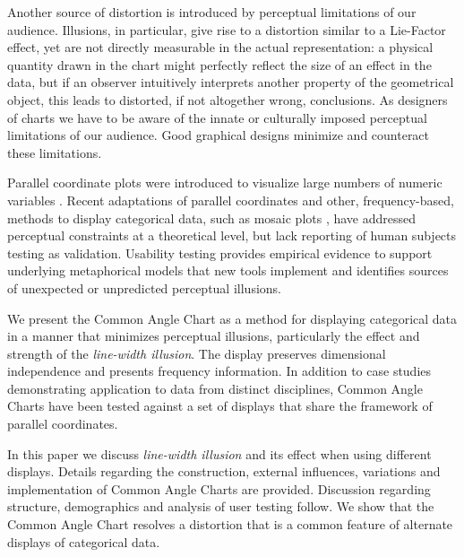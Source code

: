Another source of distortion is introduced by perceptual limitations of our audience. Illusions, in particular, give rise to a distortion similar to a Lie-Factor effect, yet are not directly measurable in the actual representation: a physical quantity drawn in the chart might  perfectly reflect the  size of an effect in the data, but if an observer  intuitively interprets another property of the geometrical object, this leads  to distorted, if not altogether wrong, conclusions. 
As designers of charts we have to be aware of the innate or culturally imposed perceptual limitations of our audience. Good graphical designs minimize and counteract these limitations. 


Parallel coordinate plots were introduced to visualize large numbers of numeric variables \citep{pcp:1885, inselberg:1985, wegman:1990}.
Recent adaptations of parallel coordinates  \citep{ kosara:2006, bendix:2005, leblanc:1990, 
spenke:2003} and other, frequency-based, methods to display categorical data, such as mosaic plots  \citep{hartigan:1981, friendly:1992, hofmann:2000, theus:1997},  have addressed perceptual constraints \citep{cleveland:1984} at a theoretical level, but lack reporting of human subjects testing as validation. 
Usability testing provides empirical evidence to support underlying metaphorical models that new tools implement and identifies sources of unexpected or unpredicted perceptual illusions.


We present the Common Angle Chart as a method for displaying categorical data in a manner that minimizes perceptual illusions, particularly the effect and strength of the {\it line-width illusion}. The display preserves dimensional independence and presents frequency information. In addition to case studies demonstrating application to data from distinct disciplines, Common Angle Charts have been tested against a set of  displays that share the framework of parallel coordinates.

In this paper we discuss {\it line-width illusion} and its effect when using different displays. Details regarding the construction, external influences, variations and implementation of Common Angle Charts are provided. Discussion regarding structure, demographics and analysis of user testing follow. We show that the Common Angle Chart resolves a distortion that is a common feature of alternate displays of categorical data.


